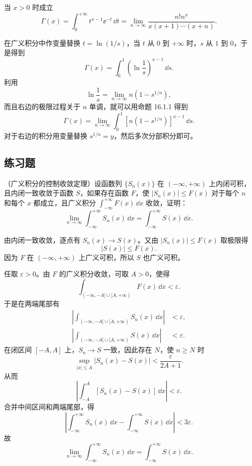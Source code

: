 \begin{xexample}[16.1.4]
当 $x>0$ 时成立
\[
  \Gamma(x)=\int_0^{+\infty}t^{x-1}\ee^{-t}\,\dd t
  =\lim_{n\to\infty}\frac{n!n^x}{x(x+1)\cdots(x+n)}.
\]
\end{xexample}

\begin{xproof}
在广义积分中作变量替换 $t=\ln(1/s)$，当 $t$ 从 $0$ 到 $+\infty$ 时，$s$ 从 $1$ 到 $0$，于是得到
\[
  \Gamma(x)=\int_0^1\left(\ln\frac1s\right)^{x-1}\,\dd s.
\]
利用
\[
  \ln\frac1s=\lim_{n\to\infty}n(1-s^{1/n}),
\]
而且右边的极限过程关于 $n$ 单调，就可以用命题 16.1.1 得到
\[
  \Gamma(x)=\lim_{n\to\infty}\int_0^1\left[n(1-s^{1/n})\right]^{x-1}\,\dd s.
\]
对于右边的积分用变量替换 $s^{1/n}=y$，然后多次分部积分即可。
\end{xproof}

\subsection{练习题}

\begin{xexercise}[1]
（广义积分的控制收敛定理）设函数列 $\{S_n(x)\}$ 在 $(-\infty,+\infty)$ 上内闭可积，且内闭一致收敛于函数 $S$，如果存在函数 $F$，使 $|S_n(x)|\leqslant F(x)$ 对于每个 $n$ 和每个 $x$ 都成立，且广义积分 $\int_{-\infty}^{+\infty}F(x)\,\dd x$ 收敛，证明：
\[
  \lim_{n\to\infty}\int_{-\infty}^{+\infty}S_n(x)\,\dd x
  =\int_{-\infty}^{+\infty}S(x)\,\dd x.
\]
\end{xexercise}
\begin{xsolution}
由内闭一致收敛，逐点有 $S_n(x)\to S(x)$。又由 $|S_n(x)|\leqslant F(x)$ 取极限得
\[
  |S(x)|\leqslant F(x).
\]
因为 $F$ 在 $(-\infty,+\infty)$ 上广义可积，所以 $S$ 也广义可积。

任取 $\varepsilon>0$。由 $F$ 的广义积分收敛，可取 $A>0$，使得
\[
  \int_{(-\infty,-A]\cup[A,+\infty)}F(x)\,\dd x<\varepsilon.
\]
于是在两端尾部有
\[
\begin{aligned}
  \left|\int_{(-\infty,-A]\cup[A,+\infty)}S_n(x)\,\dd x\right|&<\varepsilon,\\
  \left|\int_{(-\infty,-A]\cup[A,+\infty)}S(x)\,\dd x\right|&<\varepsilon.
\end{aligned}
\]
在闭区间 $[-A,A]$ 上，$S_n\to S$ 一致，因此存在 $N$，使 $n\geqslant N$ 时
\[
  \sup_{|x|\leqslant A}|S_n(x)-S(x)|<\frac{\varepsilon}{2A+1}.
\]
从而
\[
  \left|\int_{-A}^A[S_n(x)-S(x)]\,\dd x\right|<\varepsilon.
\]
合并中间区间和两端尾部，得
\[
  \left|\int_{-\infty}^{+\infty}S_n(x)\,\dd x-
  \int_{-\infty}^{+\infty}S(x)\,\dd x\right|<3\varepsilon.
\]
故
\[
  \lim_{n\to\infty}\int_{-\infty}^{+\infty}S_n(x)\,\dd x
  =\int_{-\infty}^{+\infty}S(x)\,\dd x.
\]
\end{xsolution}


